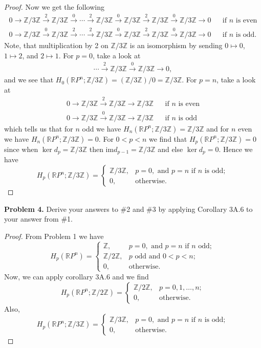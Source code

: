 \documentclass[leqno]{article}
\theoremstyle{nonumberplain}
\newtheorem{proof}{Proof}
\newcommand{\im}{\mathrm{im}}
\newcommand{\R}{\mathbb{R}}
\newcommand{\Z}{\mathbb{Z}}
\begin{document}
\begin{proof}
Now we get the following
\begin{align*}
0\rightarrow \Z/3\Z \xrightarrow{2} \Z/3\Z \xrightarrow{0} \cdots \xrightarrow{2} \Z/3\Z \xrightarrow{0} \Z/3\Z \xrightarrow{2} \Z/3\Z \xrightarrow{0} \Z/3\Z \rightarrow 0 && \textrm{if $n$ is even}\\
0\rightarrow \Z/3\Z \xrightarrow{0} \Z/3\Z \xrightarrow{2} \cdots \xrightarrow{2} \Z/3\Z \xrightarrow{0} \Z/3\Z \xrightarrow{2} \Z/3\Z \xrightarrow{0} \Z/3\Z \rightarrow 0 && \textrm{if $n$ is odd.}
\end{align*}
Note, that multiplication by 2 on $\Z/3\Z$ is an isomorphism by sending $0\mapsto 0$, $1\mapsto 2$, and $2\mapsto 1$.  For $p=0$, take a look at
\begin{align*}
\cdots \xrightarrow{2} \Z/3\Z \xrightarrow{0} \Z/3\Z \rightarrow 0,
\end{align*}
and we see that $H_0(\R P^n; \Z/3\Z)=(\Z/3\Z)/0=\Z/3\Z$.  For $p=n$, take a look at
\begin{align*}
0 \rightarrow \Z/3\Z \xrightarrow{2} \Z/3\Z \rightarrow \Z/3\Z && \textrm{if $n$ is even}\\
0 \rightarrow \Z/3\Z \xrightarrow{0} \Z/3\Z \rightarrow \Z/3\Z && \textrm{if $n$ is odd}
\end{align*}
which tells us that for $n$ odd we have $H_n(\R P^n;\Z/3\Z)= \Z/3\Z$ and for $n$ even we have $H_n(\R P^n;\Z/3\Z)=0$.  For $0<p<n$ we find that $H_p(\R P^n;\Z/3\Z)=0$ since when $\ker d_p = \Z/3\Z$ then $\im d_{p-1} = \Z/3\Z$ and else $\ker d_p = 0$.  Hence we have
\[
H_p(\R P^n;\Z/3\Z)=
\begin{cases}
\Z/3\Z,& p=0, \textrm{ and $p=n$ if $n$ is odd};\\
0, &\textrm{otherwise}.
\end{cases}
\]
\end{proof}

\vspace*{1cm}


\noindent\textbf{Problem 4.} 
Derive your answers to \#2 and \#3 by applying Corollary 3A.6 to your answer from \#1.

\begin{proof}
From Problem 1 we have
\[
H_p(\R P^n) = 
\begin{cases}
\Z, & p=0, \textrm{ and } p=n \textrm{ if $n$ odd};\\
\Z/2\Z, & \textrm{$p$ odd and $0<p<n$};\\ 
0, & \textrm{otherwise}.
\end{cases}
\]
Now, we can apply corollary 3A.6 and we find
\[
H_p(\R P^n;\Z/2\Z)=
\begin{cases}
\Z/2\Z,& p=0,1,\dots,n;\\
0, &\textrm{otherwise}.
\end{cases}
\]
Also,
\[
H_p(\R P^n;\Z/3\Z)=
\begin{cases}
\Z/3\Z,& p=0, \textrm{ and $p=n$ if $n$ is odd};\\
0, &\textrm{otherwise}.
\end{cases}
\]
\end{proof}
\end{document}
